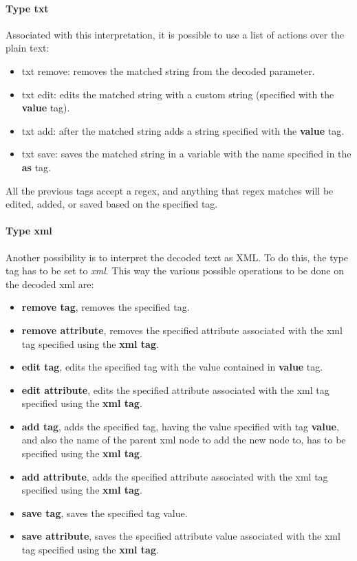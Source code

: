 \paragraph{Type txt}
Associated with this interpretation, it is possible to use a list of actions over the plain text:
\begin{itemize}
    \item txt remove: removes the matched string from the decoded parameter.
    \item txt edit: edits the matched string with a custom string (specified with the \textbf{value} tag).
    \item txt add: after the matched string adds a string specified with the \textbf{value} tag.
    \item txt save: saves the matched string in a variable with the name specified in the \textbf{as} tag.
\end{itemize}
All the previous tags accept a regex, and anything that regex matches will be edited, added, or saved based on the specified tag.

\paragraph{Type xml}
Another possibility is to interpret the decoded text as XML. To do this, the type tag has to be set to \textit{xml}.
This way the various possible operations to be done on the decoded xml are:
\begin{itemize}
    \item \textbf{remove tag}, removes the specified tag.
    \item \textbf{remove attribute}, removes the specified attribute associated with the xml tag specified using the \textbf{xml tag}.
    \item \textbf{edit tag}, edits the specified tag with the value contained in \textbf{value} tag.
    \item \textbf{edit attribute}, edits the specified attribute associated with the xml tag specified using the \textbf{xml tag}.
    \item \textbf{add tag}, adds the specified tag, having the value specified with tag \textbf{value}, and also the name of the parent xml node to add the new node to, has to be specified using the \textbf{xml tag}.
    \item \textbf{add attribute}, adds the specified attribute associated with the xml tag specified using the \textbf{xml tag}.
    \item \textbf{save tag}, saves the specified tag value.
    \item \textbf{save attribute}, saves the specified attribute value associated with the xml tag specified using the \textbf{xml tag}.
\end{itemize}

